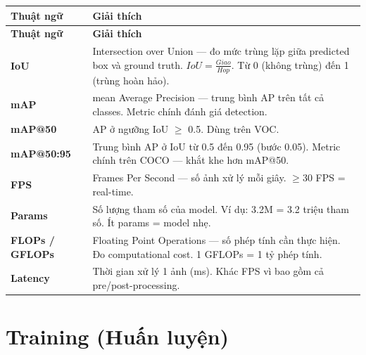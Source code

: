 \begin{longtable}{p{3.5cm}p{12cm}}
\toprule
\textbf{Thuật ngữ} & \textbf{Giải thích} \\
\midrule
\endfirsthead
\toprule
\textbf{Thuật ngữ} & \textbf{Giải thích} \\
\midrule
\endhead

\textbf{IoU} & Intersection over Union --- đo mức trùng lặp giữa predicted box và ground truth. $IoU = \frac{Giao}{Hop}$. Từ 0 (không trùng) đến 1 (trùng hoàn hảo). \\
\midrule
\textbf{mAP} & mean Average Precision --- trung bình AP trên tất cả classes. Metric chính đánh giá detection. \\
\midrule
\textbf{mAP@50} & AP ở ngưỡng IoU $\geq$ 0.5. Dùng trên VOC. \\
\midrule
\textbf{mAP@50:95} & Trung bình AP ở IoU từ 0.5 đến 0.95 (bước 0.05). Metric chính trên COCO --- khắt khe hơn mAP@50. \\
\midrule
\textbf{FPS} & Frames Per Second --- số ảnh xử lý mỗi giây. $\geq$30 FPS = real-time. \\
\midrule
\textbf{Params} & Số lượng tham số của model. Ví dụ: 3.2M = 3.2 triệu tham số. Ít params = model nhẹ. \\
\midrule
\textbf{FLOPs / GFLOPs} & Floating Point Operations --- số phép tính cần thực hiện. Đo computational cost. 1 GFLOPs = 1 tỷ phép tính. \\
\midrule
\textbf{Latency} & Thời gian xử lý 1 ảnh (ms). Khác FPS vì bao gồm cả pre/post-processing. \\
\bottomrule
\end{longtable}

\section*{Training (Huấn luyện)}

